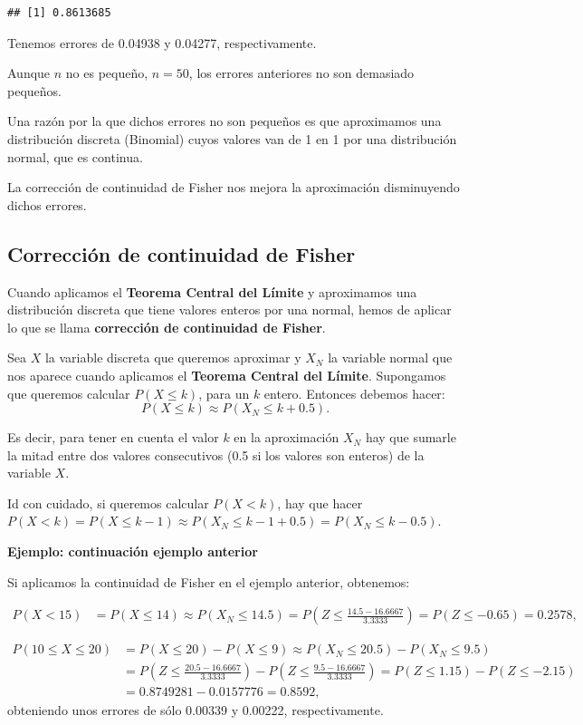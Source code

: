 \documentclass[]{book}
\begin{document}
\begin{verbatim}
## [1] 0.8613685
\end{verbatim}

Tenemos errores de 0.04938 y 0.04277, respectivamente.

Aunque \(n\) no es pequeño, \(n=50\), los errores anteriores no son demasiado pequeños.

Una razón por la que dichos errores no son pequeños es que aproximamos una distribución discreta (Binomial) cuyos valores van de 1 en 1 por una distribución normal, que es continua.

La corrección de continuidad de Fisher nos mejora la aproximación disminuyendo dichos errores.

\hypertarget{correcciuxf3n-de-continuidad-de-fisher}{%
\subsection{Corrección de continuidad de Fisher}\label{correcciuxf3n-de-continuidad-de-fisher}}

Cuando aplicamos el \textbf{Teorema Central del Límite} y aproximamos una distribución discreta que tiene valores enteros por una normal, hemos de aplicar lo que se llama \textbf{corrección de continuidad de Fisher}.

Sea \(X\) la variable discreta que queremos aproximar y \(X_N\) la variable normal que nos aparece cuando aplicamos el \textbf{Teorema Central del Límite}. Supongamos que queremos calcular \(P(X\leq k)\), para un \(k\) entero. Entonces debemos hacer:
\[
P(X\leq k)\approx P(X_N\leq k+0.5).
\]

Es decir, para tener en cuenta el valor \(k\) en la aproximación \(X_N\) hay que sumarle la mitad entre dos valores consecutivos (0.5 si los valores son enteros) de la variable \(X\).

Id con cuidado, si queremos calcular \(P(X<k)\), hay que hacer \(P(X<k) =P(X\leq k-1)\approx P(X_N \leq k-1+0.5)=P(X_N\leq k-0.5)\).

\textbf{Ejemplo: continuación ejemplo anterior}

Si aplicamos la continuidad de Fisher en el ejemplo anterior, obtenemos:

\[
\begin{array}{rl}
P(X< 15) & = P(X\leq 14) \approx P(X_N \leq 14.5)=P\left(Z\leq \frac{14.5-16.6667}{3.3333}\right) =P(Z\leq -0.65) = 0.2578,
\end{array}
\]

\[
\begin{array}{rl}
P(10\leq X\leq 20) &= P(X\leq 20)-P(X\leq 9)\approx P(X_N \leq 20.5)-P(X_N\leq 9.5) \\ & = P\left(Z\leq \frac{20.5-16.6667}{3.3333}\right) - P\left(Z\leq \frac{9.5-16.6667}{3.3333}\right)=  P(Z\leq 1.15)-P(Z\leq -2.15)\\ & =0.8749281-0.0157776 = 0.8592,
\end{array}
\]
obteniendo unos errores de sólo 0.00339 y 0.00222, respectivamente.
\end{document}
